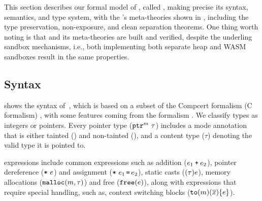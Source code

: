 

This section describes our formal model of \systemname, called
\lang, making precise its syntax, semantics, and type system,
with the \systemname’s meta-theories shown in \Cref{}, including the type preservation, non-exposure, and clean separation theorems.
One thing worth noting is that \lang and its meta-theories are built and verified, despite the underling sandbox mechanisms,
i.e., both implementing both separate heap and WASM sandboxes result in the same properties.


\subsection{Syntax}\label{sec:syntax}
 shows the syntax of~\lang, 
which is based on a subset of the Compcert formalism (C formalism) \cite{Blazy2009}, with some features coming from the \checkedc formalism \cite{li22checkedc}.
We classify types as integers or pointers.
Every pointer type ($\mathtt{ptr}^{m}~{\tau}$) includes a
 mode annotation that is either tainted (\umode) and non-tainted (\cmode),
and a content type ($\tau$) denoting the valid type it is pointed to.

\lang expressions include common expressions such as addition ($e_1 \mathbin{\texttt{+}} e_2$), 
pointer dereference ($\texttt{*}~{e}$) and assignment ($\texttt{*}~{e_1}\,\texttt{=}\, {e_2}$),
 static casts ($\mathtt{(}{\tau}\mathtt{)}{e}$),
memory allocations ($\mathtt{malloc}({m},{\tau})$) and free ($\mathtt{free}({e})$), 
along with expressions that require special handling, such as, context switching blocks ($\mathtt{to}({m})(\overline{x})\{e\}$).


